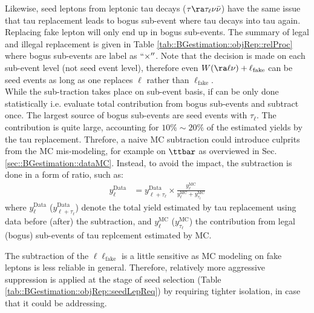 Likewise, seed leptons from leptonic tau decays ($\tau \ra \tau_{\ell} \nu\bar{\nu}$) have the same issue 
that tau replacement leads to bogus sub-event where tau decays into tau again. Replacing fake lepton will only end up in bogus sub-events. 
The summary of legal and illegal replacement is given in Table \ref{tab::BGestimation::objRep::relProc} where bogus sub-events are label as $``\times''$.
Note that the decision is made on each sub-event level (not seed event level), therefore even $W(\ra \ell \nu)+\ell_{\mathrm{fake}}$ can be seed events as long as one replaces $\ell$ rather than $\ell_{\mathrm{fake}}$. \\

While the sub-traction takes place on sub-event basis, if can be only done statistically i.e. evaluate total contribution from bogus sub-events and subtract once. The largest source of bogus sub-events are seed events with $\tau_{\ell}$.
The contribution is quite large, accounting for $10\%\sim20\%$ of the estimated yields by the tau replacement. 
Threfore, a naive MC subtraction could introduce culprits from the MC mis-modeling, for example on $\ttbar$ as overviewed in Sec. \ref{sec::BGestimation::dataMC}. Instead, to avoid the impact, the subtraction is done in a form of ratio, such as:
\begin{align}
  y^{\mathrm{Data}}_{\ell} 
  & = y^{\mathrm{Data}}_{\ell+\tau_{\ell}} \times \frac{y^{\mathrm{MC}}_{\ell}}{y^{\mathrm{MC}}_{\ell}+y^{\mathrm{MC}}_{\tau_{\ell}}}  
\end{align}
where $y^{\mathrm{Data}}_{\ell}$ ($y^{\mathrm{Data}}_{\ell+\tau_{\ell}}$) denote the total yield estimated by tau replacement using data before (after) the subtraction, and $y^{\mathrm{MC}}_{\ell}$ ($y^{\mathrm{MC}}_{\tau_{\mathrm{\ell}}}$) the contribution from legal (bogus) sub-events of tau replcement estimated by MC.

The subtraction of the $\ell\ell_{\mathrm{fake}}$ is a little sensitive as MC modeling on fake leptons is less reliable in general. Therefore, relatively more aggressive suppression is applied at the stage of seed selection (Table \ref{tab::BGestimation::objRep::seedLepReq}) by requiring tighter isolation, in case that it could be addressing. \\


